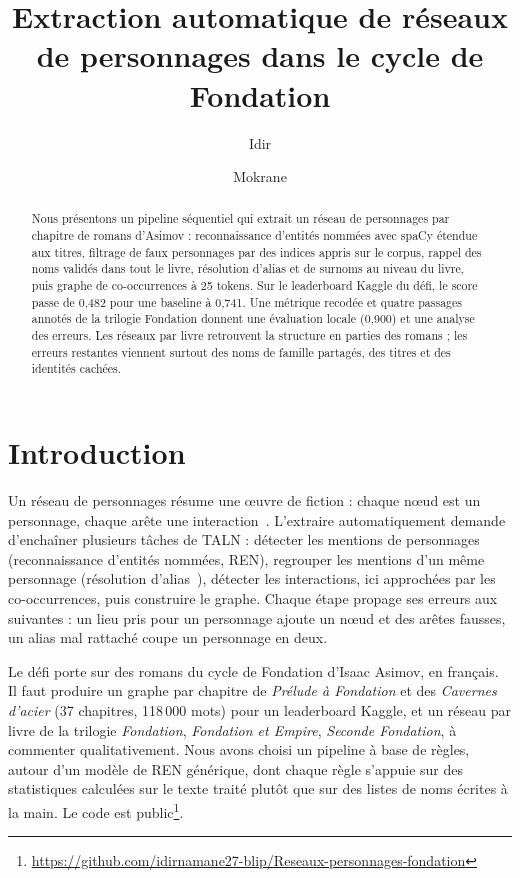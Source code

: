 \documentclass[cameraready]{Interspeech}
\title{Extraction automatique de réseaux de personnages dans le cycle de Fondation}
\author[affiliation={1}]{Idir}{Namane}
\author[affiliation={1}]{Mokrane}{Slimani}
\begin{document}
\maketitle

\begin{abstract}
Nous présentons un pipeline séquentiel qui extrait un réseau de personnages par chapitre de romans d'Asimov :
reconnaissance d'entités nommées avec spaCy étendue aux titres, filtrage de faux personnages par des indices
appris sur le corpus, rappel des noms validés dans tout le livre, résolution d'alias et de surnoms au niveau du
livre, puis graphe de co-occurrences à 25 tokens. Sur le leaderboard Kaggle du défi, le score passe de 0,482
pour une baseline à 0,741. Une métrique recodée et quatre passages annotés de la trilogie Fondation donnent une
évaluation locale (0,900) et une analyse des erreurs. Les réseaux par livre retrouvent la structure en parties
des romans ; les erreurs restantes viennent surtout des noms de famille partagés, des titres et des identités
cachées.
\end{abstract}

\section{Introduction}

Un réseau de personnages résume une œuvre de fiction : chaque nœud est un personnage, chaque arête une
interaction~\cite{labatut2019}. L'extraire automatiquement demande d'enchaîner plusieurs tâches de TALN : détecter
les mentions de personnages (reconnaissance d'entités nommées, REN), regrouper les mentions d'un même personnage
(résolution d'alias~\cite{vala2015}), détecter les interactions, ici approchées par les co-occurrences, puis
construire le graphe. Chaque étape propage ses erreurs aux suivantes : un lieu pris pour un personnage ajoute un
nœud et des arêtes fausses, un alias mal rattaché coupe un personnage en deux.

Le défi porte sur des romans du cycle de Fondation d'Isaac Asimov, en français. Il faut produire un graphe par
chapitre de \emph{Prélude à Fondation} et des \emph{Cavernes d'acier} (37 chapitres, 118\,000 mots) pour un
leaderboard Kaggle, et un réseau par livre de la trilogie \emph{Fondation}, \emph{Fondation et Empire},
\emph{Seconde Fondation}, à commenter qualitativement. Nous avons choisi un pipeline à base de règles, autour
d'un modèle de REN générique, dont chaque règle s'appuie sur des statistiques calculées sur le texte traité
plutôt que sur des listes de noms écrites à la main. Le code est
public\footnote{\url{https://github.com/idirnamane27-blip/Reseaux-personnages-fondation}}.
\end{document}
